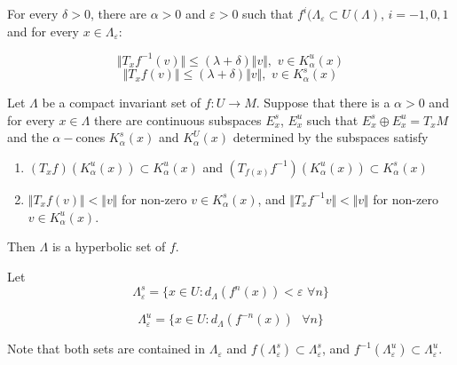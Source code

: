 \begin{prop}

For every $\delta > 0$, there are $\alpha > 0$ and $\varepsilon > 0$ such that $f^i(\Lambda_{\varepsilon} \subset U(\Lambda)$, $i=-1,0,1$ and for every $x \in \Lambda_{\varepsilon}$:

\[\Vert T_xf^{-1}(v) \Vert \leq (\lambda + \delta) \Vert v \Vert,\hspace{4pt} v \in K^u_{\alpha}(x)\]
\[\Vert T_x f (v) \Vert \leq (\lambda + \delta) \Vert v \Vert, \hspace{4pt} v \in K^s_{\alpha}(x)\]
\end{prop}

\begin{prop}
Let $\Lambda$ be a compact invariant set of $f:U \to M$. Suppose that there is a $\alpha > 0$ and for every $x \in \Lambda$ there are continuous subspaces $E^s_x$, $E^u_x$ such that $E^s_x \oplus E^u_x = T_xM$ and the $\alpha-$cones $K^s_{\alpha}(x)$ and $K^U_{\alpha}(x)$ determined by the subspaces satisfy

\begin{enumerate}
    \item $(T_xf)(K^u_{\alpha}(x)) \subset K^u_{\alpha}(x) $ and $ (T_{f(x)}f^{-1})(K^u_{\alpha}(x)) \subset K^s_{\alpha}(x) $
    \item $\Vert T_xf(v) \Vert < \Vert v \Vert$ for non-zero $v \in K^s_{\alpha}(x)$, and $\Vert T_xf^{-1} v \Vert < \Vert v \Vert$ for non-zero $v \in K^u_{\alpha}(x)$.
\end{enumerate}

Then $\Lambda$ is a hyperbolic set of $f$. 

\end{prop}

Let 
\[\Lambda^s_{\varepsilon}=\{ x \in U: d_{\Lambda}(f^n(x)) < \varepsilon \hspace{4pt} \forall n \}\]

\[\Lambda^u_{\varepsilon} = \{ x \in U: d_{\Lambda}(f^{-n}(x)) \hspace{4pt} \hspace{4pt} \forall n \}\]

\indent Note that both sets are contained in $\Lambda_{\varepsilon}$ and $f(\Lambda^s_{\varepsilon}) \subset \Lambda^s_{\varepsilon}$, and $f^{-1}(\Lambda^u_{\varepsilon}) \subset \Lambda^u_{\varepsilon}$.

